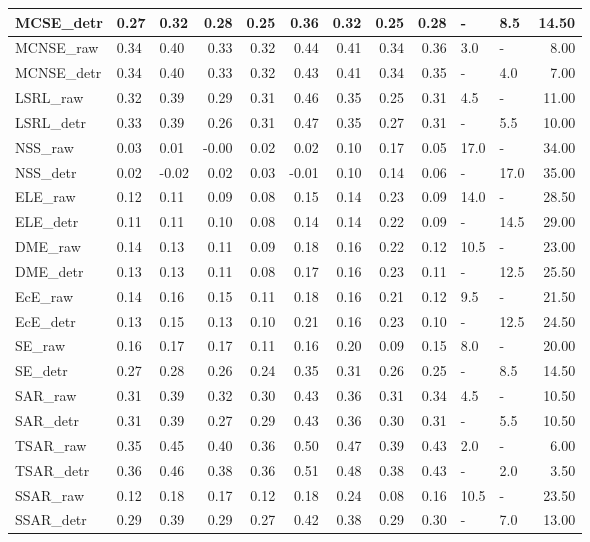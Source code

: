 \begin{tabular}{lllrrrrrrllr}
MCSE\_detr & 0.27 & 0.32 & 0.28 & 0.25 & 0.36 & 0.32 & 0.25 & 0.28 & - & 8.5 & 14.50 \\
\midrule
MCNSE\_raw & 0.34 & 0.40 & 0.33 & 0.32 & 0.44 & 0.41 & 0.34 & 0.36 & 3.0 & - & 8.00 \\
MCNSE\_detr & 0.34 & 0.40 & 0.33 & 0.32 & 0.43 & 0.41 & 0.34 & 0.35 & - & 4.0 & 7.00 \\
\midrule
LSRL\_raw & 0.32 & 0.39 & 0.29 & 0.31 & 0.46 & 0.35 & 0.25 & 0.31 & 4.5 & - & 11.00 \\
LSRL\_detr & 0.33 & 0.39 & 0.26 & 0.31 & 0.47 & 0.35 & 0.27 & 0.31 & - & 5.5 & 10.00 \\
\midrule
NSS\_raw & 0.03 & 0.01 & -0.00 & 0.02 & 0.02 & 0.10 & 0.17 & 0.05 & 17.0 & - & 34.00 \\
NSS\_detr & 0.02 & -0.02 & 0.02 & 0.03 & -0.01 & 0.10 & 0.14 & 0.06 & - & 17.0 & 35.00 \\
\midrule
ELE\_raw & 0.12 & 0.11 & 0.09 & 0.08 & 0.15 & 0.14 & 0.23 & 0.09 & 14.0 & - & 28.50 \\
ELE\_detr & 0.11 & 0.11 & 0.10 & 0.08 & 0.14 & 0.14 & 0.22 & 0.09 & - & 14.5 & 29.00 \\
\midrule
DME\_raw & 0.14 & 0.13 & 0.11 & 0.09 & 0.18 & 0.16 & 0.22 & 0.12 & 10.5 & - & 23.00 \\
DME\_detr & 0.13 & 0.13 & 0.11 & 0.08 & 0.17 & 0.16 & 0.23 & 0.11 & - & 12.5 & 25.50 \\
\midrule
EcE\_raw & 0.14 & 0.16 & 0.15 & 0.11 & 0.18 & 0.16 & 0.21 & 0.12 & 9.5 & - & 21.50 \\
EcE\_detr & 0.13 & 0.15 & 0.13 & 0.10 & 0.21 & 0.16 & 0.23 & 0.10 & - & 12.5 & 24.50 \\
\midrule
SE\_raw & 0.16 & 0.17 & 0.17 & 0.11 & 0.16 & 0.20 & 0.09 & 0.15 & 8.0 & - & 20.00 \\
SE\_detr & 0.27 & 0.28 & 0.26 & 0.24 & 0.35 & 0.31 & 0.26 & 0.25 & - & 8.5 & 14.50 \\
\midrule
SAR\_raw & 0.31 & 0.39 & 0.32 & 0.30 & 0.43 & 0.36 & 0.31 & 0.34 & 4.5 & - & 10.50 \\
SAR\_detr & 0.31 & 0.39 & 0.27 & 0.29 & 0.43 & 0.36 & 0.30 & 0.31 & - & 5.5 & 10.50 \\
\midrule
TSAR\_raw & 0.35 & 0.45 & 0.40 & 0.36 & 0.50 & 0.47 & 0.39 & 0.43 & 2.0 & - & 6.00 \\
TSAR\_detr & 0.36 & 0.46 & 0.38 & 0.36 & 0.51 & 0.48 & 0.38 & 0.43 & - & 2.0 & 3.50 \\
\midrule
SSAR\_raw & 0.12 & 0.18 & 0.17 & 0.12 & 0.18 & 0.24 & 0.08 & 0.16 & 10.5 & - & 23.50 \\
SSAR\_detr & 0.29 & 0.39 & 0.29 & 0.27 & 0.42 & 0.38 & 0.29 & 0.30 & - & 7.0 & 13.00 \\
\midrule
\bottomrule
\end{tabular}
\midrule
